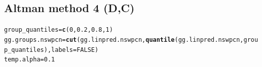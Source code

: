 \documentclass{article}\usepackage[]{graphicx}\usepackage[]{color}
\makeatletter
\newcommand{\hlnum}[1]{\textcolor[rgb]{0.686,0.059,0.569}{#1}}%
\newcommand{\hlstd}[1]{\textcolor[rgb]{0.345,0.345,0.345}{#1}}%
\newcommand{\hlkwb}[1]{\textcolor[rgb]{0.69,0.353,0.396}{#1}}%
\newcommand{\hlkwc}[1]{\textcolor[rgb]{0.333,0.667,0.333}{#1}}%
\newcommand{\hlkwd}[1]{\textcolor[rgb]{0.737,0.353,0.396}{\textbf{#1}}}%
\newenvironment{kframe}{%
 \def\at@end@of@kframe{}%
 \ifinner\ifhmode%
  \def\at@end@of@kframe{\end{minipage}}%
  \begin{minipage}{\columnwidth}%
 \fi\fi%
 \def\FrameCommand##1{\hskip\@totalleftmargin \hskip-\fboxsep
 \colorbox{shadecolor}{##1}\hskip-\fboxsep
     \hskip-\linewidth \hskip-\@totalleftmargin \hskip\columnwidth}%
 \MakeFramed {\advance\hsize-\width
   \@totalleftmargin\z@ \linewidth\hsize
   \@setminipage}}%
 {\par\unskip\endMakeFramed%
 \at@end@of@kframe}
\newenvironment{knitrout}{}{} %
\makeatother
\begin{document}
\subsection{Altman method 4 (D,C)}
\begin{knitrout}
\color{fgcolor}\begin{kframe}
\begin{alltt}
\hlstd{group_quantiles} \hlkwb{=} \hlkwd{c}\hlstd{(}\hlnum{0}\hlstd{,} \hlnum{0.2}\hlstd{,} \hlnum{0.8}\hlstd{,} \hlnum{1}\hlstd{)}
\hlstd{gg.groups.nswpcn} \hlkwb{=} \hlkwd{cut}\hlstd{(gg.linpred.nswpcn,} \hlkwd{quantile}\hlstd{(gg.linpred.nswpcn, group_quantiles),} \hlkwc{labels} \hlstd{=} \hlnum{FALSE}\hlstd{)}
\hlstd{temp.alpha} \hlkwb{=} \hlnum{0.1}
\end{alltt}
\end{kframe}
\end{knitrout}
\end{document}
